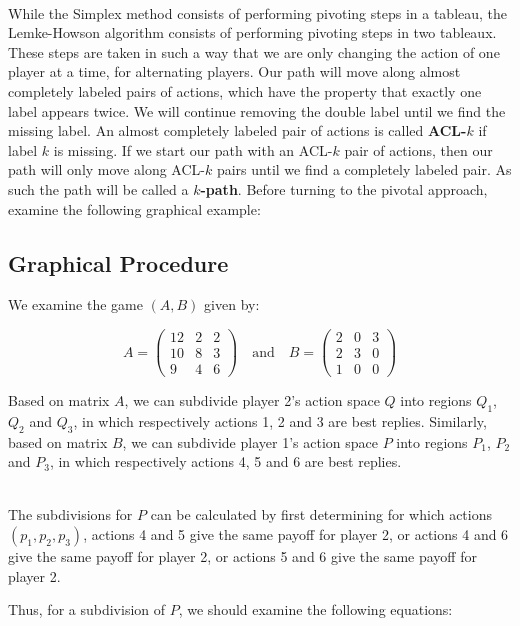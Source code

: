 \documentclass[12pt]{article}
\begin{document}
\noindent
\\
While the Simplex method consists of performing pivoting steps in a tableau, the Lemke-Howson algorithm consists of performing pivoting steps in two tableaux.
These steps are taken in such a way that we are only changing the action of one player at a time, for alternating players.
Our path will move along almost completely labeled pairs of actions, which have the property that exactly one label appears twice.
We will continue removing the double label until we find the missing label.
An almost completely labeled pair of actions is called \textbf{ACL-$k$} if label $k$ is missing.
If we start our path with an ACL-$k$ pair of actions, then our path will only move along ACL-$k$ pairs until we find a completely labeled pair.
As such the path will be called a \textbf{$k$-path}.
Before turning to the pivotal approach, examine the following graphical example:

\subsection{Graphical Procedure}
We examine the game $(A, B)$ given by:

\[ A = \begin{pmatrix}
    12 & 2 & 2 \\
    10 & 8 & 3 \\
    9 & 4 & 6
\end{pmatrix} \quad \text{and} \quad
B = \begin{pmatrix}
    2 & 0 & 3 \\
    2 & 3 & 0 \\
    1 & 0 & 0
\end{pmatrix} \]

\noindent
Based on matrix $A$, we can subdivide player 2's action space $Q$ into regions $Q_1$, $Q_2$ and $Q_3$, in which respectively actions 1, 2 and 3 are best replies.
Similarly, based on matrix $B$, we can subdivide player 1's action space $P$ into regions $P_1$, $P_2$ and $P_3$, in which respectively actions 4, 5 and 6 are best replies.

\noindent
\\
The subdivisions for $P$ can be calculated by first determining for which actions $(p_1, p_2, p_3)$, actions 4 and 5 give the same payoff for player 2, or actions 4 and 6 give the same payoff for player 2, or actions 5 and 6 give the same payoff for player 2.

\newpage
\noindent
Thus, for a subdivision of $P$, we should examine the following equations:
\end{document}
